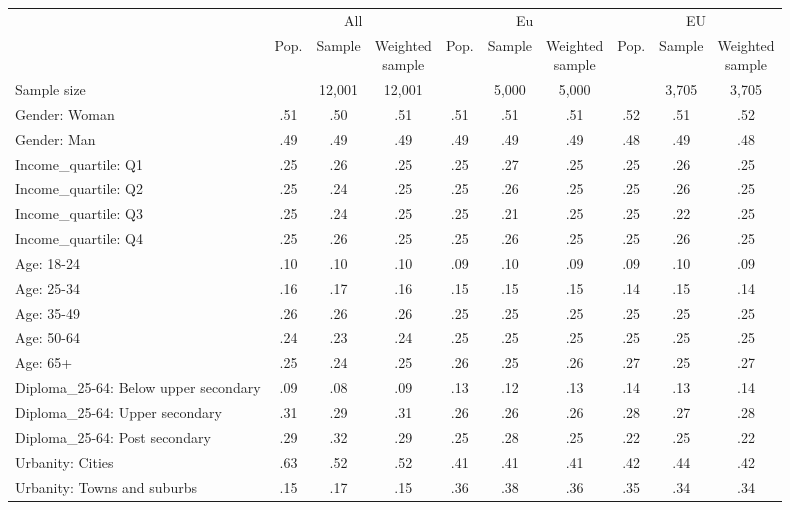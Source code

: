 
\begin{tabular}[t]{lccccccccc}
\toprule
\multicolumn{1}{c}{} & \multicolumn{3}{c}{All} & \multicolumn{3}{c}{Eu} & \multicolumn{3}{c}{EU} \\
\cmidrule(l{3pt}r{3pt}){2-4} \cmidrule(l{3pt}r{3pt}){5-7} \cmidrule(l{3pt}r{3pt}){8-10}
  & Pop. & Sample & \makecell{Weighted\\sample} & Pop. & Sample & \makecell{Weighted\\sample} & Pop. & Sample & \makecell{Weighted\\sample}\\
\midrule
Sample size &  & 12,001 & 12,001 &  & 5,000 & 5,000 &  & 3,705 & 3,705\\
\addlinespace
Gender: Woman & .51 & .50 & .51 & .51 & .51 & .51 & .52 & .51 & .52\\
Gender: Man & .49 & .49 & .49 & .49 & .49 & .49 & .48 & .49 & .48\\
\addlinespace
Income\_quartile: Q1 & .25 & .26 & .25 & .25 & .27 & .25 & .25 & .26 & .25\\
Income\_quartile: Q2 & .25 & .24 & .25 & .25 & .26 & .25 & .25 & .26 & .25\\
Income\_quartile: Q3 & .25 & .24 & .25 & .25 & .21 & .25 & .25 & .22 & .25\\
Income\_quartile: Q4 & .25 & .26 & .25 & .25 & .26 & .25 & .25 & .26 & .25\\
\addlinespace
Age: 18-24 & .10 & .10 & .10 & .09 & .10 & .09 & .09 & .10 & .09\\
Age: 25-34 & .16 & .17 & .16 & .15 & .15 & .15 & .14 & .15 & .14\\
Age: 35-49 & .26 & .26 & .26 & .25 & .25 & .25 & .25 & .25 & .25\\
Age: 50-64 & .24 & .23 & .24 & .25 & .25 & .25 & .25 & .25 & .25\\
Age: 65+ & .25 & .24 & .25 & .26 & .25 & .26 & .27 & .25 & .27\\
\addlinespace
Diploma\_25-64: Below upper secondary & .09 & .08 & .09 & .13 & .12 & .13 & .14 & .13 & .14\\
Diploma\_25-64: Upper secondary & .31 & .29 & .31 & .26 & .26 & .26 & .28 & .27 & .28\\
Diploma\_25-64: Post secondary & .29 & .32 & .29 & .25 & .28 & .25 & .22 & .25 & .22\\
\addlinespace
Urbanity: Cities & .63 & .52 & .52 & .41 & .41 & .41 & .42 & .44 & .42\\
Urbanity: Towns and suburbs & .15 & .17 & .15 & .36 & .38 & .36 & .35 & .34 & .34\\

\end{tabular}

